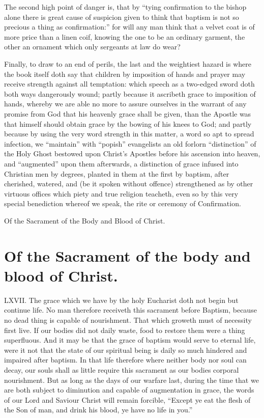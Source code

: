The second high point of danger is, that by “tying confirmation to the bishop alone there is great cause of suspicion given to think that baptism is not so precious a thing as confirmation:” for will any man think that a velvet coat is of more price than a linen coif, knowing the one to be an ordinary garment, the other an ornament which only sergeants at law do wear?

Finally, to draw to an end of perils, the last and the weightiest hazard is where the book itself doth say that children by imposition of hands and prayer may receive strength against all temptation: which speech as a two-edged sword doth both ways dangerously wound; partly because it ascribeth grace to imposition of hands, whereby we are able no more to assure ourselves in the warrant of any promise from God that his heavenly grace shall be given, than the Apostle was that himself should obtain grace by the bowing of his knees to God; and partly because by using the very word strength in this matter, a word so apt to spread infection, we “maintain” with “popish” evangelists an old forlorn “distinction” of the Holy Ghost bestowed upon Christ’s Apostles before his ascension into heaven, and “augmented” upon them afterwards, a distinction of grace infused into Christian  men by degrees,
 planted in them at the first by baptism, after cherished, watered, and (be it spoken without offence) strengthened as by other virtuous offices which piety and true religion teacheth, even so by this very special benediction whereof we speak, the rite or ceremony of Confirmation.


Of the Sacrament of the Body and Blood of Christ.
\section*{Of the Sacrament of the body and blood of Christ.}
LXVII. The grace which we have by the holy Eucharist doth not begin but continue life. No man therefore receiveth this sacrament before Baptism, because no dead thing is capable of nourishment. That which groweth must of necessity first live. If our bodies did not daily waste, food to restore them were a thing superfluous. And it may be that the grace of baptism would serve to eternal life, were it not that the state of our spiritual being is daily so much hindered and impaired after baptism. In that life therefore where neither body nor soul can decay, our souls shall as little require this sacrament as our bodies corporal nourishment. But as long as the days of our warfare last, during the time that we are both subject to diminution and capable of augmentation in grace, the words of our Lord and Saviour Christ will remain forcible, “Except ye eat the flesh of the Son of man, and drink his blood, ye have no life in you.”

